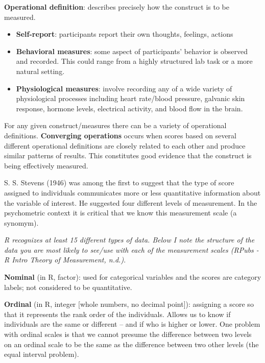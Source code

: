 \documentclass[
  english,
]{book}
\providecommand{\tightlist}{%
  \setlength{\itemsep}{0pt}\setlength{\parskip}{0pt}}
\begin{document}
\textbf{Operational definition}: describes precisely how the construct is to be measured.

\begin{itemize}
\tightlist
\item
  \textbf{Self-report}: participants report their own thoughts, feelings, actions
\item
  \textbf{Behavioral measures}: some aspect of participants' behavior is observed and recorded. This could range from a highly structured lab task or a more natural setting.
\item
  \textbf{Physiological measures}: involve recording any of a wide variety of physiological processes including heart rate/blood pressure, galvanic skin response, hormone levels, electrical activity, and blood flow in the brain.
\end{itemize}

For any given construct/measures there can be a variety of operational definitions. \textbf{Converging operations} occurs when scores based on several different operational definitions are closely related to each other and produce similar patterns of results. This constitutes good evidence that the construct is being effectively measured.

S. S. Stevens (1946) was among the first to suggest that the type of score assigned to individuals communicates more or less quantitative information about the variable of interest. He suggested four different levels of measurement. In the psychometric context it is critical that we know this measurement scale (a synomym).

\emph{R recognizes at least 15 different types of data. Below I note the structure of the data you are most likely to see/use with each of the measurement scales \citep{noauthor_rpubs_nodate}(RPubs - R Intro Theory of Measurement, n.d.)}.

\textbf{Nominal} (in R, factor): used for categorical variables and the scores are category labels; not considered to be quantitative.

\textbf{Ordinal} (in R, integer {[}whole numbers, no decimal point{]}): assigning a score so that it represents the rank order of the individuals. Allows us to know if individuals are the same or different -- and if who is higher or lower. One problem with ordinal scales is that we cannot presume the difference between two levels on an ordinal scale to be the same as the difference between two other levels (the equal interval problem).
\end{document}
